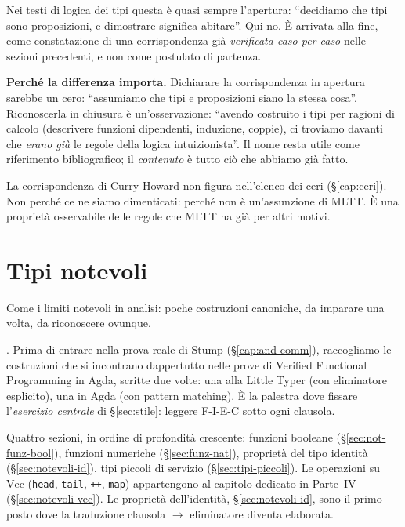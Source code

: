 \noindent Nei testi di logica dei tipi questa \`e quasi sempre l'apertura: ``decidiamo che tipi sono proposizioni, e dimostrare significa abitare''. Qui no. \`E arrivata alla fine, come constatazione di una corrispondenza gi\`a \emph{verificata caso per caso} nelle sezioni precedenti, e non come postulato di partenza.

\medskip

\noindent\textbf{Perch\'e la differenza importa.} Dichiarare la corrispondenza in apertura sarebbe un cero: ``assumiamo che tipi e proposizioni siano la stessa cosa''. Riconoscerla in chiusura \`e un'osservazione: ``avendo costruito i tipi per ragioni di calcolo (descrivere funzioni dipendenti, induzione, coppie), ci troviamo davanti che \emph{erano gi\`a} le regole della logica intuizionista''. Il nome resta utile come riferimento bibliografico; il \emph{contenuto} \`e tutto ci\`o che abbiamo gi\`a fatto.

\begin{oss}
La corrispondenza di Curry-Howard non figura nell'elenco dei ceri (\S\ref{cap:ceri}). Non perch\'e ce ne siamo dimenticati: perch\'e non \`e un'assunzione di MLTT. \`E una propriet\`a osservabile delle regole che MLTT ha gi\`a per altri motivi.
\end{oss}

\chapter{Tipi notevoli}\label{cap:notevoli}

\epigraph{Come i limiti notevoli in analisi: poche costruzioni canoniche, da imparare una volta, da riconoscere ovunque.}{}

. Prima di entrare nella prova reale di Stump (\S\ref{cap:and-comm}), raccogliamo le costruzioni che si incontrano dappertutto nelle prove di Verified Functional Programming in Agda, scritte due volte: una alla Little Typer (con eliminatore esplicito), una in Agda (con pattern matching). \`E la palestra dove fissare l'\emph{esercizio centrale} di \S\ref{sec:stile}: leggere F-I-E-C sotto ogni clausola.

\bigskip

\noindent Quattro sezioni, in ordine di profondit\`a crescente: funzioni booleane (\S\ref{sec:not-funz-bool}), funzioni numeriche (\S\ref{sec:funz-nat}), propriet\`a del tipo identit\`a (\S\ref{sec:notevoli-id}), tipi piccoli di servizio (\S\ref{sec:tipi-piccoli}). Le operazioni su $\mathrm{Vec}$ (\texttt{head}, \texttt{tail}, \texttt{++}, \texttt{map}) appartengono al capitolo dedicato in Parte~IV (\S\ref{sec:notevoli-vec}). Le propriet\`a dell'identit\`a, \S\ref{sec:notevoli-id}, sono il primo posto dove la traduzione clausola $\to$ eliminatore diventa elaborata.

